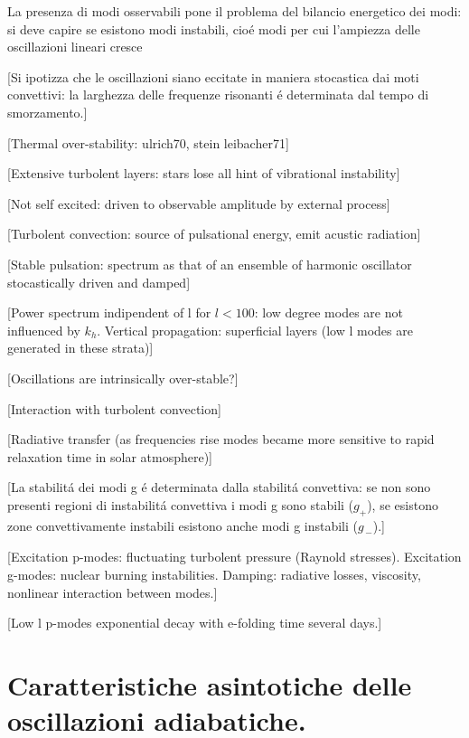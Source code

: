 \documentclass[../main.tex]{subfiles}
\begin{document}
La presenza di modi osservabili pone il problema del bilancio energetico dei modi: si deve capire se esistono modi instabili, cio\'e modi per cui l'ampiezza delle oscillazioni lineari cresce


[Si ipotizza che le oscillazioni siano eccitate in maniera stocastica dai moti convettivi: la larghezza delle frequenze risonanti \'e determinata dal tempo di smorzamento.]

[Thermal over-stability: ulrich70, stein leibacher71]

[Extensive turbolent layers: stars lose all hint of vibrational instability]

[Not self excited: driven to observable amplitude by external process]

[Turbolent convection: source of pulsational energy, emit acustic radiation]

[Stable pulsation: spectrum as that of an ensemble of harmonic oscillator stocastically driven and damped]

[Power spectrum indipendent of l for $l<100$: low degree modes are not influenced by $k_h$. Vertical propagation: superficial layers (low l modes are generated in these strata)]

[Oscillations are intrinsically over-stable?]

[Interaction with turbolent convection]

[Radiative transfer (as frequencies rise modes became more sensitive to rapid relaxation time in solar atmosphere)]

[La stabilit\'a dei modi g \'e determinata dalla stabilit\'a convettiva: se non sono presenti regioni di instabilit\'a convettiva i modi g sono stabili ($g_+$), se esistono zone convettivamente instabili esistono anche modi g instabili ($g_{\,-}$).]

[Excitation p-modes: fluctuating turbolent pressure (Raynold stresses). Excitation g-modes: nuclear burning instabilities. Damping: radiative losses, viscosity, nonlinear interaction between modes.]

[Low l p-modes exponential decay with e-folding time several days.]


{\let\clearpage\relax           %
\chapter{Caratteristiche asintotiche delle oscillazioni adiabatiche.}\label{chap:asyntoticbehavour}
}
\end{document}
